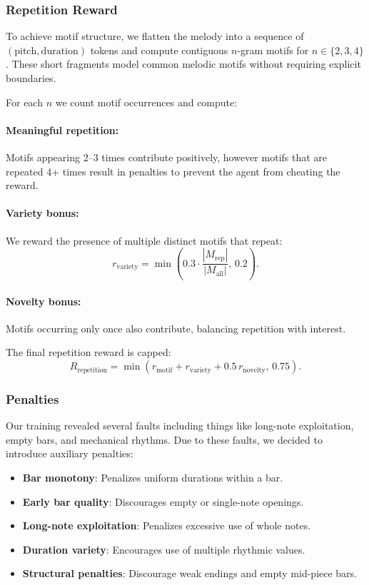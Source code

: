 \documentclass{article}
\begin{document}
\subsubsection{Repetition Reward}

To achieve motif structure, we flatten the melody into a sequence of $(\text{pitch},\text{duration})$
tokens and compute contiguous $n$-gram motifs for $n\in\{2,3,4\}$. These short fragments model common
melodic motifs without requiring explicit boundaries.

For each $n$ we count motif occurrences and compute:

\paragraph{Meaningful repetition:}
Motifs appearing 2–3 times contribute positively, however motifs that are repeated 4+ times result in penalties to prevent the agent from cheating the reward.

\paragraph{Variety bonus:}
We reward the presence of multiple distinct motifs that repeat:
\vspace{-4pt}
\[
r_{\text{variety}} = 
\min\!\left(0.3 \cdot \frac{|M_{\text{rep}}|}{|M_{\text{all}}|},\, 0.2\right).
\]

\paragraph{Novelty bonus:}
Motifs occurring only once also contribute, balancing repetition with interest.

The final repetition reward is capped:
\vspace{-4pt}
\[
R_{\text{repetition}} = 
\min(r_{\text{motif}} + r_{\text{variety}} + 0.5\, r_{\text{novelty}},\, 0.75).
\]

\subsubsection{Penalties}

Our training revealed several faults including things like long-note exploitation, empty bars, 
and mechanical rhythms. Due to these faults, we decided to introduce auxiliary penalties:

\begin{itemize}
    \item \textbf{Bar monotony}: Penalizes uniform durations within a bar.
    \item \textbf{Early bar quality}: Discourages empty or single-note openings.
    \item \textbf{Long-note exploitation}: Penalizes excessive use of whole notes.
    \item \textbf{Duration variety}: Encourages use of multiple rhythmic values.
    \item \textbf{Structural penalties}: Discourage weak endings and empty mid-piece bars.
\end{itemize}
\end{document}
